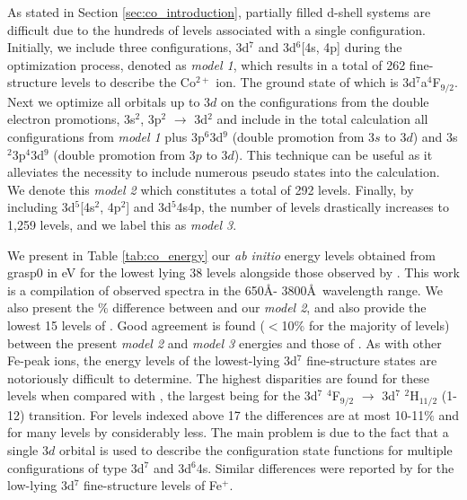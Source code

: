 As stated in Section \ref{sec:co_introduction}, partially filled d-shell systems are difficult due to the hundreds of levels associated with a single configuration. Initially, we include three configurations, 3d$^7$ and 3d$^6$[4s, 4p] during the optimization process, denoted as \textit{model 1}, which results in a total of 262 fine-structure levels to describe the Co$^{2+}$ ion. The ground state of which is 3d$^7$a$^4$F$_{9/2}$. Next we optimize all orbitals up to $3d$ on the configurations from the double electron promotions, 3s$^2$, 3p$^2$ $\rightarrow$ 3d$^2$ and include in the total calculation all configurations from \textit{model 1} plus 3p$^6$3d$^9$ (double promotion from $3s$ to $3d$) and 3s$^2$3p$^4$3d$^9$ (double promotion from $3p$ to $3d$). This technique can be useful as it alleviates the necessity to include numerous pseudo states into the calculation. We denote this \textit{model 2} which constitutes a total of 292 levels. Finally, by including 3d$^5$[4s$^2$, 4p$^2$] and 3d$^5$4s4p, the number of levels drastically increases to 1,259 levels, and we label this as \textit{model 3}. 

We present in Table \ref{tab:co_energy} our {\it ab initio} energy levels obtained from {\sc grasp}0 in eV for the lowest lying 38 levels alongside those observed by \citet{1985aeli.book.....S}. This work is a compilation of observed spectra in the 650\AA - 3800\AA ~wavelength range. We also present the $\%$ difference between \citet{1985aeli.book.....S} and our \textit{model 2}, and also provide the lowest 15 levels of \citet{2016MNRAS.tmp..556S}. Good agreement is found ($<$10\% for the majority of levels) between the present \textit{model 2} and \textit{model 3} energies and those of \citet{2016MNRAS.tmp..556S}. As with other Fe-peak ions, the energy levels of the lowest-lying 3d$^{7}$ fine-structure states are notoriously difficult to determine. The highest disparities are found for these levels when compared with \citet{1985aeli.book.....S}, the largest being for the 3d$^{7}$ $^{4}$F$_{9/2}$ $\rightarrow$ 3d$^{7}$ $^{2}$H$_{11/2}$ (1-12) transition. For levels indexed above 17 the differences are at most 10-11$\%$ and for many levels by considerably less. The main problem is due to the fact that a single $3d$ orbital is used to describe the configuration state functions for multiple configurations of type 3d$^{7}$ and 3d$^{6}$4s. Similar differences were reported by \citet{2009ADNDT..95..910R} for the low-lying 3d$^{7}$ fine-structure levels of Fe$^+$. 


